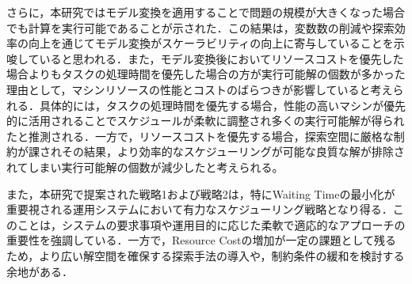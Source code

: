 さらに，本研究ではモデル変換を適用することで問題の規模が大きくなった場合でも計算を実行可能であることが示された．この結果は，変数数の削減や探索効率の向上を通じてモデル変換がスケーラビリティの向上に寄与していることを示唆していると思われる．また，モデル変換後においてリソースコストを優先した場合よりもタスクの処理時間を優先した場合の方が実行可能解の個数が多かった理由として，マシンリソースの性能とコストのばらつきが影響していると考えられる．具体的には，タスクの処理時間を優先する場合，性能の高いマシンが優先的に活用されることでスケジュールが柔軟に調整され多くの実行可能解が得られたと推測される．一方で，リソースコストを優先する場合，探索空間に厳格な制約が課されその結果，より効率的なスケジューリングが可能な良質な解が排除されてしまい実行可能解の個数が減少したと考えられる。

また，本研究で提案された戦略1および戦略2は，特にWaiting Timeの最小化が重要視される運用システムにおいて有力なスケジューリング戦略となり得る．このことは，システムの要求事項や運用目的に応じた柔軟で適応的なアプローチの重要性を強調している．一方で，Resource Costの増加が一定の課題として残るため，より広い解空間を確保する探索手法の導入や，制約条件の緩和を検討する余地がある．
